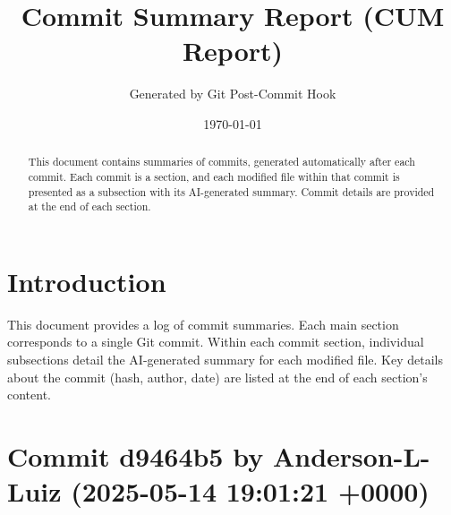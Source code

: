 \documentclass{article}
\title{Commit Summary Report (CUM Report)}
\author{Generated by Git Post-Commit Hook}
\date{\today}
\begin{document}
\maketitle
\begin{abstract}
This document contains summaries of commits, generated automatically after each commit. Each commit is a section, and each modified file within that commit is presented as a subsection with its AI-generated summary. Commit details are provided at the end of each section.
\end{abstract}
\tableofcontents
\newpage

\section{Introduction}
This document provides a log of commit summaries. Each main section corresponds to a single Git commit. Within each commit section, individual subsections detail the AI-generated summary for each modified file. Key details about the commit (hash, author, date) are listed at the end of each section's content.
\section{Commit d9464b5 by Anderson-L-Luiz (2025-05-14 19:01:21 +0000)}
\end{document}
